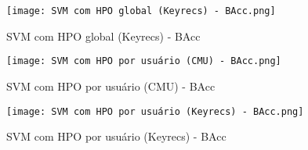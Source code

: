 \begin{figure}[H]
    \caption{SVM com HPO global (Keyrecs) - BAcc}
    \label{fig:SVM com HPO global (Keyrecs) - BAcc}
    \centering
    \texttt{[image: SVM com HPO global (Keyrecs) - BAcc.png]}
\end{figure}
\begin{figure}[H]
    \caption{SVM com HPO por usuário (CMU) - BAcc}
    \label{fig:SVM com HPO por usuário (CMU) - BAcc}
    \centering
    \texttt{[image: SVM com HPO por usuário (CMU) - BAcc.png]}
\end{figure}
\begin{figure}[H]
    \caption{SVM com HPO por usuário (Keyrecs) - BAcc}
    \label{fig:SVM com HPO por usuário (Keyrecs) - BAcc}
    \centering
    \texttt{[image: SVM com HPO por usuário (Keyrecs) - BAcc.png]}
\end{figure}